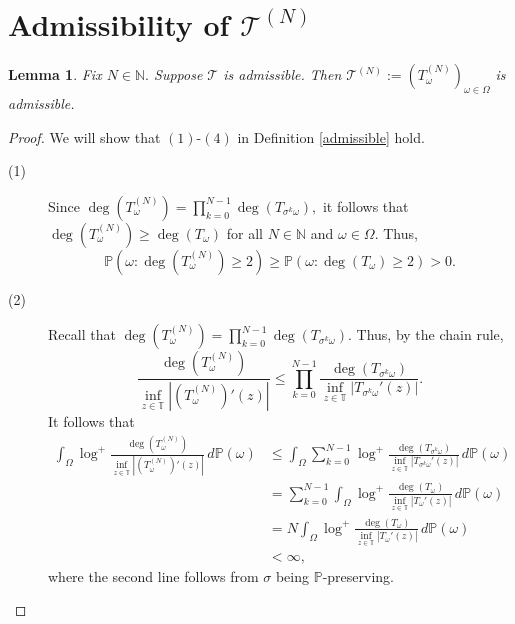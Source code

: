 \documentclass[12pt,reqno]{amsart}
\numberwithin{theorem}{section}
\newtheorem{lemma}[theorem]{Lemma}
\begin{document}
\section{Admissibility of $\mathcal{T}^{(N)}$}\label{N_admissible}
\begin{lemma}
    Fix $N\in\mathbb{N}.$ Suppose $\mathcal{T}$ is admissible. Then $\mathcal{T}^{(N)}:=(T_{\omega}^{(N)})_{\omega\in\Omega}$ is admissible.
\end{lemma}
\begin{proof} We will show that $(1)$-$(4)$ in Definition \ref{admissible} hold.
\begin{description}
    \item[(1)] Since $\deg(T_{\omega}^{(N)})=\prod_{k=0}^{N-1}\deg(T_{\sigma^{k}\omega}),$ it follows that $\deg(T_{\omega}^{(N)})\ge\deg(T_{\omega})$ for all $N\in\mathbb{N}$ and $\omega\in\Omega.$ Thus, $$\mathbb{P}(\omega:\deg(T_{\omega}^{(N)})\ge2)\ge\mathbb{P}(\omega:\deg(T_{\omega})\ge2)>0.$$

    \item[(2)]
    Recall that $\deg(T_{\omega}^{(N)})=\prod_{k=0}^{N-1}\deg(T_{\sigma^{k}\omega}).$ Thus, by the chain rule, $$\frac{\deg(T_{\omega}^{(N)})}{\inf_{z\in\mathbb{T}}|(T_{\omega}^{(N)})'(z)|}\le\prod_{k=0}^{N-1}\frac{\deg(T_{\sigma^{k}\omega})}{\inf_{z\in\mathbb{T}}|T_{\sigma^{k}\omega}'(z)|}.$$ It follows that \begin{align*}
    \int_{\Omega}\log^{+}\frac{\deg(T_{\omega}^{(N)})}{\inf_{z\in\mathbb{T}}|(T_{\omega}^{(N)})'(z)|}\,d\mathbb{P}(\omega)&\le\int_{\Omega}\sum_{k=0}^{N-1}\log^{+}\frac{\deg(T_{\sigma^{k}\omega})}{\inf_{z\in\mathbb{T}}|T_{\sigma^{k}\omega}'(z)|}\,d\mathbb{P}(\omega)\\&=\sum_{k=0}^{N-1}\int_{\Omega}\log^{+}\frac{\deg(T_{\omega})}{\inf_{z\in\mathbb{T}}|T_{\omega}'(z)|}\,d\mathbb{P}(\omega)\\&=N\int_{\Omega}\log^{+}\frac{\deg(T_{\omega})}{\inf_{z\in\mathbb{T}}|T_{\omega}'(z)|}\,d\mathbb{P}(\omega)\\&<\infty,
    \end{align*} where the second line follows from $\sigma$ being $\mathbb{P}$-preserving.


\end{description}
\end{proof}
\end{document}
